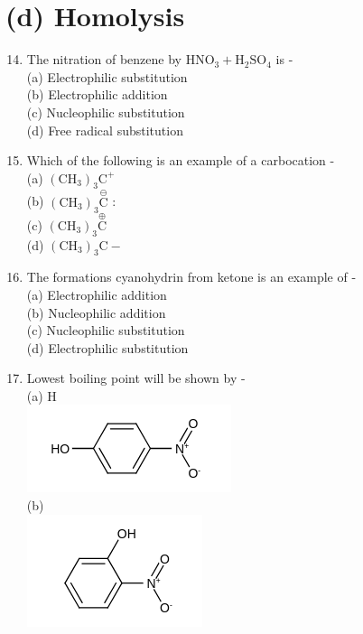 \documentclass[10pt]{article}
\begin{document}
\section*{(d) Homolysis}
\begin{enumerate}
  \setcounter{enumi}{13}
  \item The nitration of benzene by $\mathrm{HNO}_{3}+\mathrm{H}_{2} \mathrm{SO}_{4}$ is -\\
(a) Electrophilic substitution\\
(b) Electrophilic addition\\
(c) Nucleophilic substitution\\
(d) Free radical substitution
  \item Which of the following is an example of a carbocation -\\
(a) $\left(\mathrm{CH}_{3}\right)_{3} \mathrm{C}^{+}$\\
(b) $\left(\mathrm{CH}_{3}\right)_{3} \stackrel{\ominus}{\mathrm{C}}$ :\\
(c) $\left(\mathrm{CH}_{3}\right)_{3} \stackrel{\oplus}{\mathrm{C}}$\\
(d) $\left(\mathrm{CH}_{3}\right)_{3} \mathrm{C}-$
  \item The formations cyanohydrin from ketone is an example of -\\
(a) Electrophilic addition\\
(b) Nucleophilic addition\\
(c) Nucleophilic substitution\\
(d) Electrophilic substitution
  \item Lowest boiling point will be shown by -\\
(a) H\\
\includegraphics{smile-c0b4fd61f035eb43b4037a5d5ef9c84fdc141df5}\\
(b)\\
\includegraphics{smile-6e4d9034b5f0b226da3aeecba36f3db43ac0e742}\\

\end{enumerate}
\end{document}
